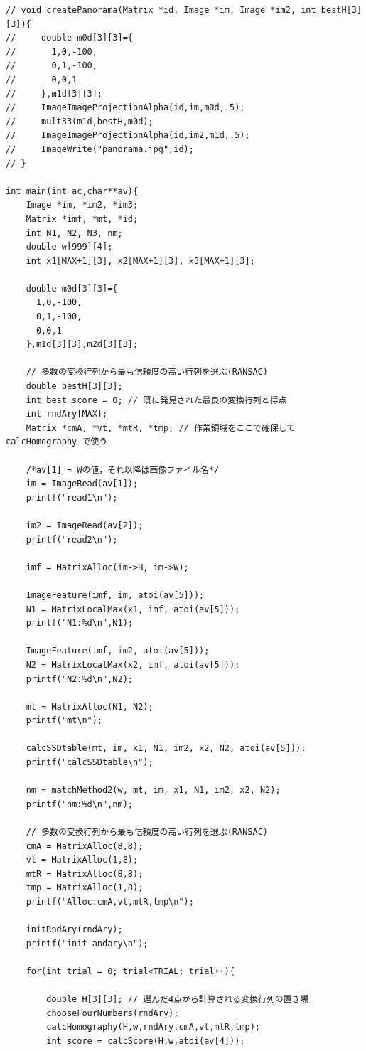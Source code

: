\documentclass[11pt]{jarticle}
\begin{document}
\begin{verbatim}
// void createPanorama(Matrix *id, Image *im, Image *im2, int bestH[3][3]){
//     double m0d[3][3]={
//       1,0,-100,
//       0,1,-100,
//       0,0,1
//     },m1d[3][3];
//     ImageImageProjectionAlpha(id,im,m0d,.5);
//     mult33(m1d,bestH,m0d);
//     ImageImageProjectionAlpha(id,im2,m1d,.5);
//     ImageWrite("panorama.jpg",id);
// }

int main(int ac,char**av){
    Image *im, *im2, *im3;
    Matrix *imf, *mt, *id;
    int N1, N2, N3, nm;
    double w[999][4];
    int x1[MAX+1][3], x2[MAX+1][3], x3[MAX+1][3];

    double m0d[3][3]={
      1,0,-100,
      0,1,-100,
      0,0,1
    },m1d[3][3],m2d[3][3];

    // 多数の変換行列から最も信頼度の高い行列を選ぶ(RANSAC)
    double bestH[3][3]; 
    int best_score = 0; // 既に発見された最良の変換行列と得点
    int rndAry[MAX];
    Matrix *cmA, *vt, *mtR, *tmp; // 作業領域をここで確保して calcHomography で使う

    /*av[1] = Wの値，それ以降は画像ファイル名*/
    im = ImageRead(av[1]);
    printf("read1\n");

    im2 = ImageRead(av[2]);
    printf("read2\n");

    imf = MatrixAlloc(im->H, im->W);

    ImageFeature(imf, im, atoi(av[5]));
    N1 = MatrixLocalMax(x1, imf, atoi(av[5]));
    printf("N1:%d\n",N1);

    ImageFeature(imf, im2, atoi(av[5]));
    N2 = MatrixLocalMax(x2, imf, atoi(av[5]));
    printf("N2:%d\n",N2);

    mt = MatrixAlloc(N1, N2);
    printf("mt\n");

    calcSSDtable(mt, im, x1, N1, im2, x2, N2, atoi(av[5]));
    printf("calcSSDtable\n");

    nm = matchMethod2(w, mt, im, x1, N1, im2, x2, N2);
    printf("nm:%d\n",nm);

    // 多数の変換行列から最も信頼度の高い行列を選ぶ(RANSAC)
    cmA = MatrixAlloc(8,8);
    vt = MatrixAlloc(1,8);
    mtR = MatrixAlloc(8,8);
    tmp = MatrixAlloc(1,8);
    printf("Alloc:cmA,vt,mtR,tmp\n");

    initRndAry(rndAry);
    printf("init andary\n");

    for(int trial = 0; trial<TRIAL; trial++){

        double H[3][3]; // 選んだ4点から計算される変換行列の置き場
        chooseFourNumbers(rndAry);
        calcHomography(H,w,rndAry,cmA,vt,mtR,tmp);
        int score = calcScore(H,w,atoi(av[4]));


\end{verbatim}
\end{document}
